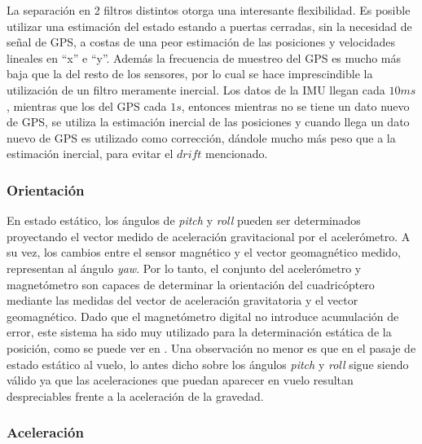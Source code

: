 \documentclass[main]{subfiles}
\begin{document}
La separación en 2 filtros distintos otorga una interesante flexibilidad. Es posible utilizar una estimación del estado estando a puertas cerradas, sin la necesidad de señal de GPS, a costas de una peor estimación de las posiciones y velocidades lineales en ``x'' e ``y''. Además la frecuencia de muestreo del GPS es mucho más baja que la del resto de los sensores, por lo cual se hace imprescindible la utilización de un filtro meramente inercial. Los datos de la IMU llegan cada $10ms$, mientras que los del GPS cada $1s$, entonces mientras no se tiene un dato nuevo de GPS, se utiliza la estimación inercial de las posiciones y cuando llega un dato nuevo de GPS es utilizado como corrección, dándole mucho más peso que a la estimación inercial, para evitar el $drift$ mencionado.

\subsubsection*{Orientación}

En estado estático, los ángulos de \emph{pitch} y \emph{roll} pueden ser determinados proyectando el vector medido de aceleración gravitacional por el acelerómetro. A su vez, los cambios entre el sensor magnético y el vector geomagnético medido, representan al ángulo \emph{yaw}. Por lo tanto, el conjunto del acelerómetro y magnetómetro son capaces de determinar la orientación del cuadricóptero mediante las medidas del vector de aceleración gravitatoria y el vector geomagnético. Dado que el magnetómetro digital no introduce acumulación de error, este sistema ha sido muy utilizado para la determinación estática de la posición, como se puede ver en \cite{bib:euler_magneto_acc}. Una observación no menor es que en el pasaje de estado estático al vuelo, lo antes dicho sobre los ángulos \emph{pitch} y \emph{roll} sigue siendo válido ya que las aceleraciones que puedan aparecer en vuelo resultan despreciables frente a la aceleración de la gravedad.

\subsubsection{Aceleración}
\end{document}
